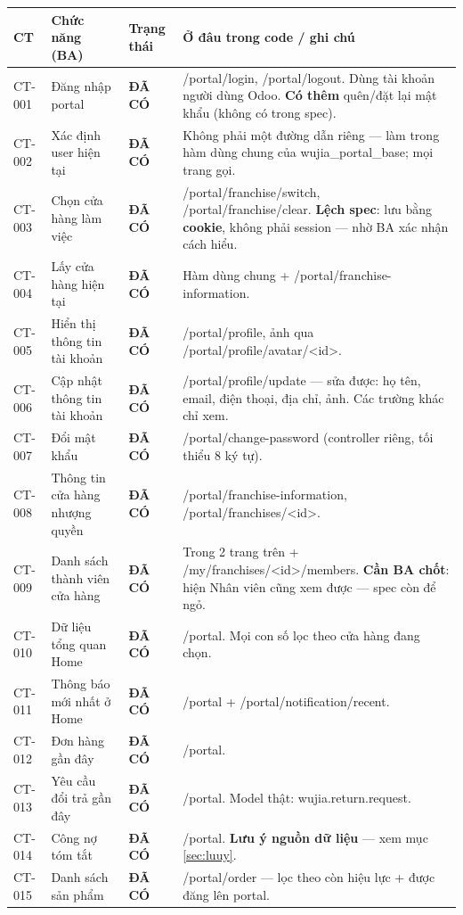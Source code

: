 \documentclass[11pt,a4paper]{report}
\newcommand{\ok}{\textcolor{okc}{\textbf{ĐÃ CÓ}}}
\newcommand{\rt}[1]{{\ttfamily\footnotesize #1}}
\begin{document}
{\small
\begin{longtable}{@{}L{1.2cm}L{4.2cm}L{1.9cm}L{7.6cm}@{}}
\toprule
\textbf{CT} & \textbf{Chức năng (BA)} & \textbf{Trạng thái} & \textbf{Ở đâu trong code / ghi chú} \\
\midrule
\endhead
CT-001 & Đăng nhập portal & \ok & \rt{/portal/login}, \rt{/portal/logout}. Dùng tài khoản người dùng Odoo. \textbf{Có thêm} quên/đặt lại mật khẩu (không có trong spec). \\
CT-002 & Xác định user hiện tại & \ok & Không phải một đường dẫn riêng — làm trong hàm dùng chung của \rt{wujia\_portal\_base}; mọi trang gọi. \\
CT-003 & Chọn cửa hàng làm việc & \ok & \rt{/portal/franchise/switch}, \rt{/portal/franchise/clear}. \textbf{Lệch spec}: lưu bằng \textbf{cookie}, không phải session — nhờ BA xác nhận cách hiểu. \\
CT-004 & Lấy cửa hàng hiện tại & \ok & Hàm dùng chung + \rt{/portal/franchise-information}. \\
CT-005 & Hiển thị thông tin tài khoản & \ok & \rt{/portal/profile}, ảnh qua \rt{/portal/profile/avatar/<id>}. \\
CT-006 & Cập nhật thông tin tài khoản & \ok & \rt{/portal/profile/update} — sửa được: họ tên, email, điện thoại, địa chỉ, ảnh. Các trường khác chỉ xem. \\
CT-007 & Đổi mật khẩu & \ok & \rt{/portal/change-password} (controller riêng, tối thiểu 8 ký tự). \\
CT-008 & Thông tin cửa hàng nhượng quyền & \ok & \rt{/portal/franchise-information}, \rt{/portal/franchises/<id>}. \\
CT-009 & Danh sách thành viên cửa hàng & \ok & Trong 2 trang trên + \rt{/my/franchises/<id>/members}. \textbf{Cần BA chốt}: hiện Nhân viên cũng xem được — spec còn để ngỏ. \\
CT-010 & Dữ liệu tổng quan Home & \ok & \rt{/portal}. Mọi con số lọc theo cửa hàng đang chọn. \\
CT-011 & Thông báo mới nhất ở Home & \ok & \rt{/portal} + \rt{/portal/notification/recent}. \\
CT-012 & Đơn hàng gần đây & \ok & \rt{/portal}. \\
CT-013 & Yêu cầu đổi trả gần đây & \ok & \rt{/portal}. Model thật: \rt{wujia.return.request}. \\
CT-014 & Công nợ tóm tắt & \ok & \rt{/portal}. \textbf{Lưu ý nguồn dữ liệu} — xem mục \ref{sec:luuy}. \\
CT-015 & Danh sách sản phẩm & \ok & \rt{/portal/order} — lọc theo còn hiệu lực + được đăng lên portal. \\

\end{longtable}}
\end{document}
